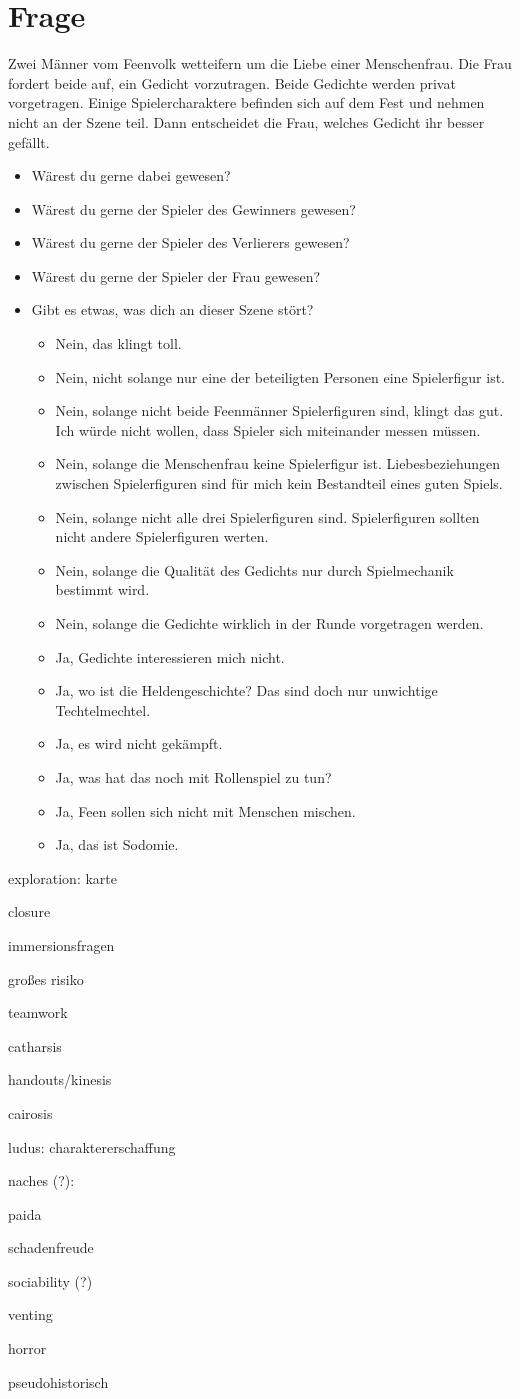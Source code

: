 \documentclass{article}
\newcommand\frage[1]{\section{Frage}\label{#1}}
\begin{document}
\frage{wettstreit}

Zwei Männer vom Feenvolk wetteifern um die Liebe einer
Menschenfrau. Die Frau fordert beide auf, ein Gedicht
vorzutragen. Beide Gedichte werden privat vorgetragen. Einige
Spielercharaktere befinden sich auf dem Fest und nehmen nicht an der
Szene teil. Dann entscheidet die Frau, welches Gedicht ihr besser
gefällt.

\begin{itemize}
\item  Wärest du gerne dabei gewesen?
\item  Wärest du gerne der Spieler des Gewinners gewesen?
\item  Wärest du gerne der Spieler des Verlierers gewesen?
\item  Wärest du gerne der Spieler der Frau gewesen?
\item  Gibt es etwas, was dich an dieser Szene stört?
  \begin{itemize}
  \item Nein, das klingt toll.
  \item Nein, nicht solange nur eine der beteiligten Personen eine Spielerfigur ist. 
  \item Nein, solange nicht beide Feenmänner Spielerfiguren sind,
    klingt das gut. Ich würde nicht wollen, dass Spieler sich miteinander messen müssen.
  \item Nein, solange die Menschenfrau keine Spielerfigur
    ist. Liebesbeziehungen zwischen Spielerfiguren sind für mich kein
    Bestandteil eines guten Spiels.
  \item Nein, solange nicht alle drei Spielerfiguren
    sind. Spielerfiguren sollten nicht andere Spielerfiguren werten.
  \item Nein, solange die Qualität des Gedichts nur durch Spielmechanik bestimmt wird.
  \item Nein, solange die Gedichte wirklich in der Runde vorgetragen werden.
  \item Ja, Gedichte interessieren mich nicht.
  \item Ja, wo ist die Heldengeschichte? Das sind doch nur unwichtige Techtelmechtel.
  \item Ja, es wird nicht gekämpft.
  \item Ja, was hat das noch mit Rollenspiel zu tun?
  \item Ja, Feen sollen sich nicht mit Menschen mischen.
  \item Ja, das ist Sodomie.
  \end{itemize}
\end{itemize}

exploration: karte

closure


immersionsfragen

großes risiko

teamwork

catharsis




handouts/kinesis

cairosis

ludus: charaktererschaffung

naches (?):

paida

schadenfreude

sociability (?)

venting

horror

pseudohistorisch 
\end{document}
